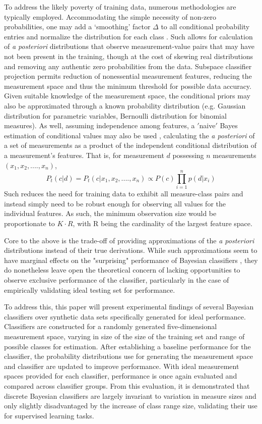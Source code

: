 \documentclass[10pt, conference]{IEEEtran}
\begin{document}
To address the likely poverty of training data, numerous methodologies are typically employed. Accommodating the simple necessity of non-zero probabilities,  one may add a ‘smoothing’ factor $\Delta$ to all conditional probability entries and normalize the distribution for each class \cite{b3}. Such allows for calculation of \textit{a posteriori} distributions that observe measurement-value pairs that may have not been present in the training, though at the cost of skewing real distributions and removing any authentic zero probabilities from the data. Subspace classifier projection permits reduction of nonessential measurement features, reducing the measurement space and thus the minimum threshold for possible data accuracy. Given suitable knowledge of the measurement space, the conditional priors may also be approximated through a known probability distribution (e.g. Gaussian distribution for parametric variables, Bernoulli distribution for binomial measures). As well, assuming independence among features, a $'$naive$'$ Bayes estimation of conditional values may also be used \cite{b1} \cite{b2}, calculating the \textit{a posteriori} of a set of measurements as a product of the independent conditional distribution of a measurement's features. That is, for measurement $d$ possessing $n$ measurements $(x_1,x_2,....,x_n)$,
\begin{equation}
P_t(c|d) = P_t(c|x_1,x_2,....,x_n) \propto P(c)\prod_{i=1}^n p(d|x_i)
\end{equation}
 Such reduces the need for training data to exhibit all measure-class pairs and instead simply need to be robust enough for observing all values for the individual features. As such, the minimum observation size would be proportionate to $K \cdot R$, with R being the cardinality of the largest feature space. 

Core to the above is the trade-off of providing approximations of the \textit{a posteriori} distributions instead of their true derivations. While such approximations seem to have marginal effects on the "surprising" performance  of Bayesian classifiers \cite{b1}, they do nonetheless leave open the theoretical concern of lacking opportunities to observe exclusive performance of the classifier, particularly in the case of empirically validating ideal testing set for performance.

To address this, this paper will present experimental findings of several Bayesian classifiers over synthetic data sets specifically generated for ideal performance. Classifiers are constructed for a randomly generated five-dimensional measurement space, varying in size of the size of the training set and range of possible classes for estimation. After establishing a baseline performance for the classifier, the probability distributions use for generating the measurement space and classifier are updated to improve performance. With ideal measurement spaces provided for each classifier, performance is once again evaluated and compared across classifier groups. From this evaluation, it is demonstrated that discrete Bayesian classifiers are largely invariant to variation in measure sizes and only slightly disadvantaged by the increase of class range size, validating their use for supervised learning tasks.
\end{document}
